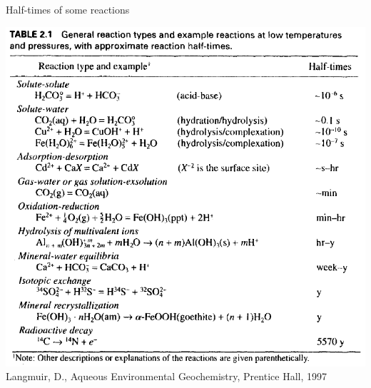 \begin{frame}{Half-times of some reactions}
	\begin{center}
		\includegraphics[height=0.85\textheight]{figures/reactive-transport/langmuir-reaction-half-times}{\scriptsize{}}\\
		{\tiny{}Langmuir, D., Aqueous Environmental Geochemistry, Prentice
			Hall, 1997}{\tiny\par}
		\par\end{center}
	
\end{frame}
%
